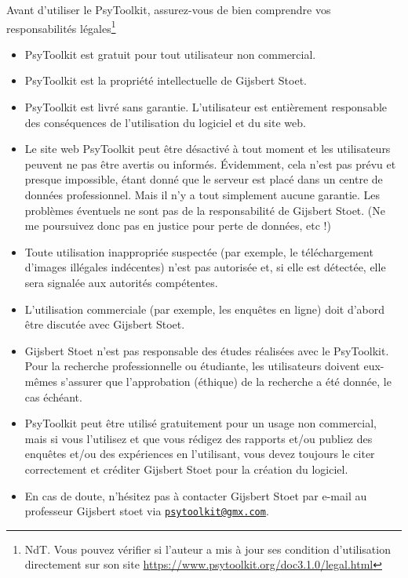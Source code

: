 \documentclass[
]{book}
\providecommand{\tightlist}{%
  \setlength{\itemsep}{0pt}\setlength{\parskip}{0pt}}
\begin{document}
Avant d'utiliser le PsyToolkit, assurez-vous de bien comprendre vos
responsabilités légales\footnote{NdT. Vous pouvez vérifier si l'auteur a
  mis à jour ses condition d'utilisation directement sur son site
  \url{https://www.psytoolkit.org/doc3.1.0/legal.html}}

\begin{itemize}
\tightlist
\item
  PsyToolkit est gratuit pour tout utilisateur non commercial.
\item
  PsyToolkit est la propriété intellectuelle de Gijsbert Stoet.
\item
  PsyToolkit est livré sans garantie. L'utilisateur est entièrement
  responsable des conséquences de l'utilisation du logiciel et du site
  web.
\item
  Le site web PsyToolkit peut être désactivé à tout moment et les
  utilisateurs peuvent ne pas être avertis ou informés. Évidemment, cela
  n'est pas prévu et presque impossible, étant donné que le serveur est
  placé dans un centre de données professionnel. Mais il n'y a tout
  simplement aucune garantie. Les problèmes éventuels ne sont pas de la
  responsabilité de Gijsbert Stoet. (Ne me poursuivez donc pas en
  justice pour perte de données, etc !)
\item
  Toute utilisation inappropriée suspectée (par exemple, le
  téléchargement d'images illégales indécentes) n'est pas autorisée et,
  si elle est détectée, elle sera signalée aux autorités compétentes.
\item
  L'utilisation commerciale (par exemple, les enquêtes en ligne) doit
  d'abord être discutée avec Gijsbert Stoet.
\item
  Gijsbert Stoet n'est pas responsable des études réalisées avec le
  PsyToolkit. Pour la recherche professionnelle ou étudiante, les
  utilisateurs doivent eux-mêmes s'assurer que l'approbation (éthique)
  de la recherche a été donnée, le cas échéant.
\item
  PsyToolkit peut être utilisé gratuitement pour un usage non
  commercial, mais si vous l'utilisez et que vous rédigez des rapports
  et/ou publiez des enquêtes et/ou des expériences en l'utilisant, vous
  devez toujours le citer correctement et créditer Gijsbert Stoet pour
  la création du logiciel.
\item
  En cas de doute, n'hésitez pas à contacter Gijsbert Stoet par e-mail
  au professeur Gijsbert stoet via
  \href{mailto:psytoolkit@gmx.com}{\nolinkurl{psytoolkit@gmx.com}}.
\end{itemize}
\end{document}
